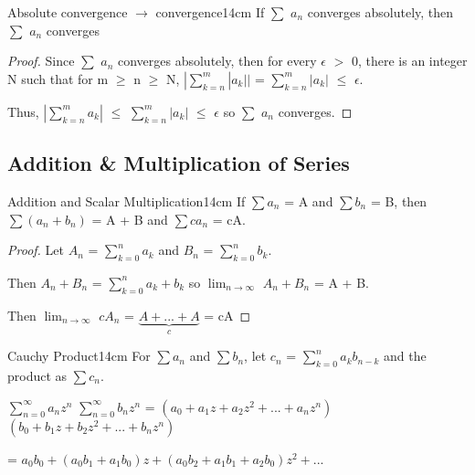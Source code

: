     \vspace{0.5cm}



    \begin{wtheorem}{Absolute convergence $\rightarrow$ convergence}{14cm}
        If $\sum$ $a_n$ converges absolutely, then $\sum$ $a_n$ converges
    \end{wtheorem}

    \begin{proof}
        Since $\sum$ $a_n$ converges absolutely, then for every
        $\epsilon$ $>$ 0, there is an integer N such that for m $\geq$ n $\geq$ N,
        $|\sum_{k=n}^m |a_k||$ = $\sum_{k=n}^m |a_k|$ $\leq$ $\epsilon$.

        Thus, 
        $|\sum_{k=n}^m a_k|$
        $\leq$ $\sum_{k=n}^m |a_k|$
        $\leq$ $\epsilon$
        so $\sum$ $a_n$ converges.
    \end{proof}

    \vspace{0.5cm}





\subsection[ Addition \& Multiplication ]{ Addition \& Multiplication of Series }

    \begin{wtheorem}{Addition and Scalar Multiplication}{14cm}
        If $\sum a_n$ = A and $\sum b_n$ = B, then
        $\sum (a_n + b_n)$ = A + B and $\sum ca_n$ = cA.
    \end{wtheorem}

    \begin{proof}
        Let $A_n$ = $\sum_{k=0}^n a_k$ and $B_n$ = $\sum_{k=0}^n b_k$.

        Then $A_n + B_n$ = $\sum_{k=0}^n a_k + b_k$
        so $\lim_{n \rightarrow \infty}$ $A_n + B_n$
        = A + B.

        Then $\lim_{n \rightarrow \infty}$ $cA_n$
        = $\underbrace{A + ... + A}_c$ = cA
    \end{proof}

    \newpage



    \begin{definition}{Cauchy Product}{14cm}
        For $\sum a_n$ and $\sum b_n$, let
        $c_n$ = $\sum_{k=0}^n a_k b_{n-k}$
        and the product as $\sum c_n$.

        \vspace{0.2cm}

        $\sum_{n=0}^{\infty} a_n z^n$ $\sum_{n=0}^{\infty} b_n z^n$
        = $(a_0 + a_1z + a_2z^2 + ... + a_nz^n)$
        $(b_0 + b_1z + b_2z^2 + ... + b_nz^n)$

        \hspace{3.9cm}
        = $a_0b_0 + (a_0b_1 + a_1b_0)z + (a_0b_2 + a_1b_1 + a_2b_0)z^2 + ... $
    \end{definition}

